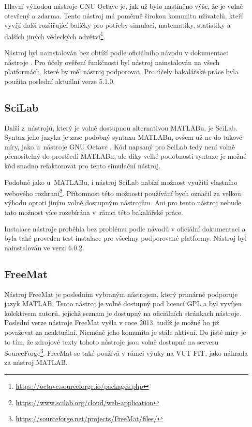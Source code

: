 Hlavní výhodou nástroje GNU Octave je, jak už bylo nastíněno výše, že je volně otevřený a zdarma. Tento nástroj má poměrně širokou komunitu uživatelů, kteří vyvíjí další rozšiřující balíčky pro potřeby simulací, matematiky, statistiky a dalších jiných vědeckých odvětví\footnote{\url{https://octave.sourceforge.io/packages.php}}.

Nástroj byl nainstalován bez obtíží podle oficiálního návodu v dokumentaci nástroje \cite{OctaveManual}. Pro účely ověření funkčnosti byl nástroj nainstalován na všech platformách, které by měl nástroj podporovat. Pro účely bakalářské práce byla použita poslední aktuální verze 5.1.0.

\subsection{SciLab}
\label{scilab-desc}
Další z~nástrojů, který je volně dostupnou alternativou MATLABu, je SciLab. Syntax jeho jazyka je zase podobný syntaxu MATLABu, ovšem už ne do takové míry, jako u~nástroje GNU Octave \cite{Gilberto}. Kód napsaný pro SciLab tedy není volně přenositelný do prostředí MATLABu, ale díky velké podobnosti syntaxe je možné kód snadno refaktorovat pro tento simulační nástroj.

Podobně jako u~MATLABu, i nástroj SciLab nabízí možnost využití vlastního webového rozhraní\footnote{\url{https://www.scilab.org/cloud/web-application}}. Přítomnost této možnosti používání bych označil za velkou výhodu oproti jiným volně dostupným nástrojům. Ani pro tento nástroj nebude tato možnost více rozebírána v~rámci této bakalářské práce.

Instalace nástroje proběhla bez problému podle návodů v oficiální dokumentaci a byla také proveden test instalace pro všechny podporované platformy. Nástroj byl nainstalován ve verzi 6.0.2.

\subsection{FreeMat}
\label{FreeMat-desc}

Nástroj FreeMat je posledním vybraným nástrojem, který primárně podporuje jazyk MATLAB. Tento nástroj je volně dostupný pod licencí GPL a byl vyvíjen kolektivem autorů, jejichž seznam je dostupný na oficiálních stránkach nástroje\cite{FreeMat}. Poslední verze nástroje FreeMat vyšla v roce 2013, tudíž je možné ho již považovat za neaktuální. Nicméně jeho komunita je stále aktivní. Do jisté míry je to tím, že zdrojové texty tohoto nástroje jsou volně dostupné na serveru SourceForge\footnote{\url{https://sourceforge.net/projects/FreeMat/files/}}. FreeMat se také používá v rámci výuky na VUT FIT, jako náhrada za nástroj MATLAB.

